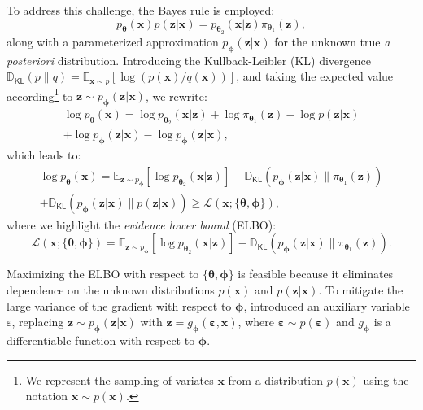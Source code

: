 \documentclass[fleqn,usenatbib]{mnras}
\newcommand{\DKL}[0]{\ensuremath{\mathbb{D}_{\mathsf{KL}}}}
\begin{document}
To address this challenge, the Bayes rule is employed:
\begin{equation}
p_{\bm{\theta}}(\bm{x}) p(\bm{z}|\bm{x}) = p_{\bm{\theta}_2}(\bm{x}|\bm{z}) \pi_{\bm{\theta}_1}(\bm{z}),
\end{equation}
along with a parameterized approximation $p_{\bm{\phi}}(\bm{z}|\bm{x})$ for the unknown true \textit{a posteriori} distribution. Introducing the Kullback-Leibler (KL) divergence $\DKL(p\|q) = \mathbb{E}_{\bm{x} \sim p}[\log(p(\bm{x})/q(\bm{x}))]$, and taking the expected value according\footnote{We represent the sampling of variates $\bm{x}$ from a distribution $p(\bm{x})$ using the notation $\bm{x}\sim p(\bm{x})$.}  to $\bm{z} \sim p_{\bm{\phi}}(\bm{z}|\bm{x})$, we rewrite:
\begin{multline}
\log p_{\bm{\theta}}(\bm{x}) = \log p_{\bm{\theta}_2}(\bm{x}|\bm{z}) + \log \pi_{\bm{\theta}_1}(\bm{z}) - \log p(\bm{z}|\bm{x}) \\ 
+ \log p_{\bm{\phi}}(\bm{z}|\bm{x}) - \log p_{\bm{\phi}}(\bm{z}|\bm{x}),
\end{multline}
which leads to:
\begin{multline}
\log p_{\bm{\theta}}(\bm{x}) = \mathbb{E}_{\bm{z} \sim p_{\bm{\phi}}}[\log p_{\bm{\theta}_2}(\bm{x}|\bm{z})] 
- \DKL(p_{\bm{\phi}}(\bm{z}|\bm{x}) \| \pi_{\bm{\theta}_1}(\bm{z})) \\ 
+ \DKL(p_{\bm{\phi}}(\bm{z}|\bm{x}) \| p(\bm{z}|\bm{x})) \geq \mathcal{L}(\bm{x}; \{\bm{\theta}, \bm{\phi}\}),
\label{eq-VAE-ELBO}
\end{multline}
where we highlight the \textit{evidence lower bound} (ELBO):
\begin{equation}
\mathcal{L}(\bm{x}; \{\bm{\theta}, \bm{\phi}\}) = \mathbb{E}_{\bm{z} \sim p_{\bm{\phi}}}[\log p_{\bm{\theta}_2}(\bm{x}|\bm{z})] 
- \DKL(p_{\bm{\phi}}(\bm{z}|\bm{x}) \| \pi_{\bm{\theta}_1}(\bm{z})).
\end{equation}

Maximizing the ELBO with respect to $\{\bm{\theta}, \bm{\phi}\}$ is feasible because it eliminates dependence on the unknown distributions $p(\bm{x})$ and $p(\bm{z}|\bm{x})$. To mitigate the large variance of the gradient with respect to $\bm{\phi}$, \cite{Kingma2014} introduced an auxiliary variable $\varepsilon$, replacing $\bm{z} \sim p_{\bm{\phi}}(\bm{z}|\bm{x})$ with $\bm{z} = g_{\bm{\phi}}(\bm{\varepsilon}, \bm{x})$, where $\bm{\varepsilon} \sim p(\bm{\varepsilon})$ and $g_{\bm{\phi}}$ is a differentiable function with respect to $\bm{\phi}$.
\end{document}
